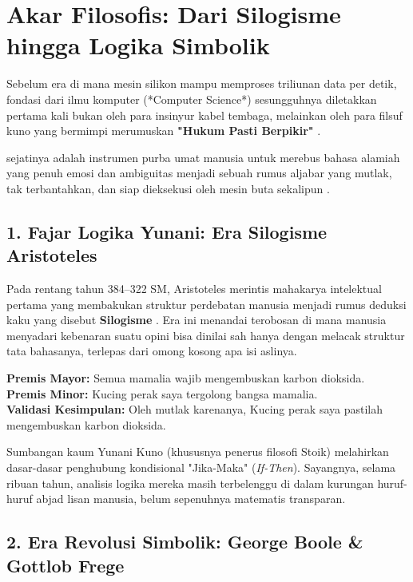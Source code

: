 \section{Akar Filosofis: Dari Silogisme hingga Logika Simbolik}

Sebelum era di mana mesin silikon mampu memproses triliunan data per detik, fondasi dari ilmu komputer (*Computer Science*) sesungguhnya diletakkan pertama kali bukan oleh para insinyur kabel tembaga, melainkan oleh para filsuf kuno yang bermimpi merumuskan \textbf{"Hukum Pasti Berpikir"} \cite{wiki_proplogic}. 

 sejatinya adalah instrumen purba umat manusia untuk merebus bahasa alamiah yang penuh emosi dan ambiguitas menjadi sebuah rumus aljabar yang mutlak, tak terbantahkan, dan siap dieksekusi oleh mesin buta sekalipun \cite{rosen2019,copi2014,forallx}.

\subsection{1. Fajar Logika Yunani: Era Silogisme Aristoteles}

Pada rentang tahun 384--322 SM, Aristoteles merintis mahakarya intelektual pertama yang membakukan struktur perdebatan manusia menjadi rumus deduksi kaku yang disebut \textbf{Silogisme} \cite{iep_logic_history}. Era ini menandai terobosan di mana manusia menyadari kebenaran suatu opini bisa dinilai sah hanya dengan melacak struktur tata bahasanya, terlepas dari omong kosong apa isi aslinya.

\begin{contoh}
\indent \textbf{Premis Mayor:} Semua mamalia wajib mengembuskan karbon dioksida. \\
\indent \textbf{Premis Minor:} Kucing perak saya tergolong bangsa mamalia. \\
\indent \textbf{Validasi Kesimpulan:} Oleh mutlak karenanya, Kucing perak saya pastilah mengembuskan karbon dioksida.
\end{contoh}

Sumbangan kaum Yunani Kuno (khususnya penerus filosofi Stoik) melahirkan dasar-dasar penghubung kondisional "Jika-Maka" (\textit{If-Then}). Sayangnya, selama ribuan tahun, analisis logika mereka masih terbelenggu di dalam kurungan huruf-huruf abjad lisan manusia, belum sepenuhnya matematis transparan.

\subsection{2. Era Revolusi Simbolik: George Boole \& Gottlob Frege}

